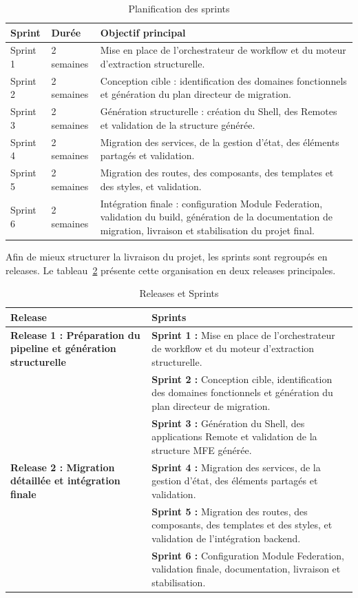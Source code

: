 \begingroup
\renewcommand{\arraystretch}{1.25}
\setlength{\tabcolsep}{4pt}
\begin{longtable}{|p{2.0cm}|p{2.0cm}|p{8.85cm}|}
\caption{Planification des sprints}\label{tab:planification-sprints}\\
\hline
\textbf{Sprint} & \textbf{Durée} & \textbf{Objectif principal} \\
\hline
Sprint 1 & 2 semaines & Mise en place de l'orchestrateur de workflow et du moteur d'extraction structurelle. \\
\hline
Sprint 2 & 2 semaines & Conception cible : identification des domaines fonctionnels et génération du plan directeur de migration. \\
\hline
Sprint 3 & 2 semaines & Génération structurelle : création du Shell, des Remotes et validation de la structure générée. \\
\hline
Sprint 4 & 2 semaines & Migration des services, de la gestion d'état, des éléments partagés et validation. \\
\hline
Sprint 5 & 2 semaines & Migration des routes, des composants, des templates et des styles, et validation. \\
\hline
Sprint 6 & 2 semaines & Intégration finale : configuration Module Federation, validation du build, génération de la documentation de migration, livraison et stabilisation du projet final. \\
\hline
\end{longtable}
\endgroup

Afin de mieux structurer la livraison du projet, les sprints sont regroupés en releases. Le tableau~\ref{tab:releases-sprints} présente cette organisation en deux releases principales.

\begingroup
\renewcommand{\arraystretch}{1.25}
\setlength{\tabcolsep}{4pt}
\begin{longtable}{|p{4.5cm}|p{8.65cm}|}
\caption{Releases et Sprints}\label{tab:releases-sprints}\\
\hline
\textbf{Release} & \textbf{Sprints} \\
\hline
\textbf{Release 1 : Préparation du pipeline et génération structurelle} & \textbf{Sprint 1 :} Mise en place de l'orchestrateur de workflow et du moteur d'extraction structurelle. \\
& \textbf{Sprint 2 :} Conception cible, identification des domaines fonctionnels et génération du plan directeur de migration. \\
& \textbf{Sprint 3 :} Génération du Shell, des applications Remote et validation de la structure MFE générée. \\
\hline
\textbf{Release 2 : Migration détaillée et intégration finale} & \textbf{Sprint 4 :} Migration des services, de la gestion d'état, des éléments partagés et validation. \\
& \textbf{Sprint 5 :} Migration des routes, des composants, des templates et des styles, et validation de l'intégration backend. \\
& \textbf{Sprint 6 :} Configuration Module Federation, validation finale, documentation, livraison et stabilisation. \\
\hline
\end{longtable}
\endgroup

